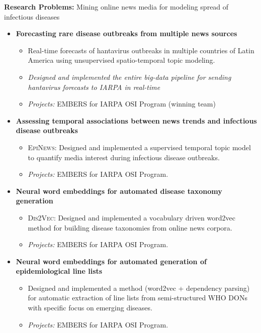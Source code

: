 \par{\textbf{Research Problems:} Mining online news media for modeling spread of infectious diseases\vspace{0.5em}
\begin{itemize}
 \item  \textbf{Forecasting rare disease outbreaks from multiple news sources}
   \begin{itemize}
     \item Real-time forecasts of hantavirus outbreaks in multiple countries of Latin America using unsupervised spatio-temporal topic modeling.
     \item \textit{Designed and implemented the entire big-data pipeline for sending hantavirus forecasts to IARPA in real-time}  
     \item \textit{Projects:} EMBERS for IARPA OSI Program (winning team)
   \end{itemize}\vspace{0.25em}
 \item \textbf{Assessing temporal associations between news trends and infectious disease outbreaks}
   \begin{itemize}
     \item {\textsc{EpiNews}}: Designed and implemented a supervised temporal topic model to quantify media interest during infectious disease outbreaks.
     \item \textit{Projects:} EMBERS for IARPA OSI Program.
   \end{itemize}\vspace{0.25em}
 \item \textbf{Neural word embeddings for automated disease taxonomy generation}
   \begin{itemize}
     \item {\textsc{Dis2Vec}}: Designed and implemented a vocabulary driven word2vec method for building disease taxonomies 
                               from online news corpora.
     \item \textit{Projects:} EMBERS for IARPA OSI Program.
   \end{itemize}
 \item \textbf{Neural word embeddings for automated generation of epidemiological line lists}
   \begin{itemize}
     \item Designed and implemented a method (word2vec + dependency parsing) for automatic extraction of line lists from semi-structured WHO DONs with specific focus on emerging diseases.
     \item \textit{Projects:} EMBERS for IARPA OSI Program.
   \end{itemize}
\end{itemize}
}
